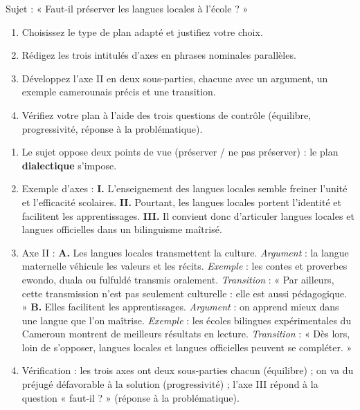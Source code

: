 \documentclass[11pt]{article}
\begin{document}
\begin{exercice}
Sujet : « Faut-il préserver les langues locales à l'école ? »
\begin{enumerate}
\item Choisissez le type de plan adapté et justifiez votre choix.
\item Rédigez les trois intitulés d'axes en phrases nominales parallèles.
\item Développez l'axe II en deux sous-parties, chacune avec un argument, un exemple camerounais précis et une transition.
\item Vérifiez votre plan à l'aide des trois questions de contrôle (équilibre, progressivité, réponse à la problématique).
\end{enumerate}
\end{exercice}

\begin{corrige}[Exercice]
\begin{enumerate}
\item Le sujet oppose deux points de vue (préserver / ne pas préserver) : le plan \textbf{dialectique} s'impose.
\item Exemple d'axes : \textbf{I.} L'enseignement des langues locales semble freiner l'unité et l'efficacité scolaires. \textbf{II.} Pourtant, les langues locales portent l'identité et facilitent les apprentissages. \textbf{III.} Il convient donc d'articuler langues locales et langues officielles dans un bilinguisme maîtrisé.
\item Axe II : \textbf{A.} Les langues locales transmettent la culture. \emph{Argument} : la langue maternelle véhicule les valeurs et les récits. \emph{Exemple} : les contes et proverbes ewondo, duala ou fulfuldé transmis oralement. \emph{Transition} : « Par ailleurs, cette transmission n'est pas seulement culturelle : elle est aussi pédagogique. » \textbf{B.} Elles facilitent les apprentissages. \emph{Argument} : on apprend mieux dans une langue que l'on maîtrise. \emph{Exemple} : les écoles bilingues expérimentales du Cameroun montrent de meilleurs résultats en lecture. \emph{Transition} : « Dès lors, loin de s'opposer, langues locales et langues officielles peuvent se compléter. »
\item Vérification : les trois axes ont deux sous-parties chacun (équilibre) ; on va du préjugé défavorable à la solution (progressivité) ; l'axe III répond à la question « faut-il ? » (réponse à la problématique).
\end{enumerate}
\end{corrige}
\end{document}
